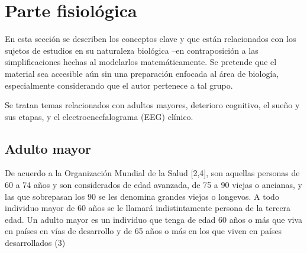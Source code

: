 \chapter{Parte fisiol\'ogica}

En esta secci\'on se describen los conceptos clave y que est\'an relacionados con los sujetos de
estudios en su naturaleza biol\'ogica --en contraposici\'on a las simplificaciones hechas al
modelarlos matem\'aticamente. 
Se pretende que el material sea accesible a\'un sin una preparaci\'on enfocada al \'area de
biolog\'ia, especialmente considerando que el autor pertenece a tal grupo.

Se tratan temas relacionados con adultos mayores, deterioro cognitivo, el sue\~no y sus etapas,
y el electroencefalograma (EEG) cl\'inico.


\section{Adulto mayor}

De acuerdo a la Organización Mundial de la Salud [2,4], son aquellas personas de 60 a 74 años 
y son considerados de edad avanzada, de 75 a 90 viejas o ancianas, y las que sobrepasan los 90 
se les denomina grandes viejos o longevos. A todo individuo mayor de 60 años se le llamará 
indistintamente persona de la tercera edad. Un adulto mayor es un individuo que tenga de edad 
60 años o más que viva en países en vías de desarrollo y de 65 años o más en los que viven en 
países desarrollados (3) 

